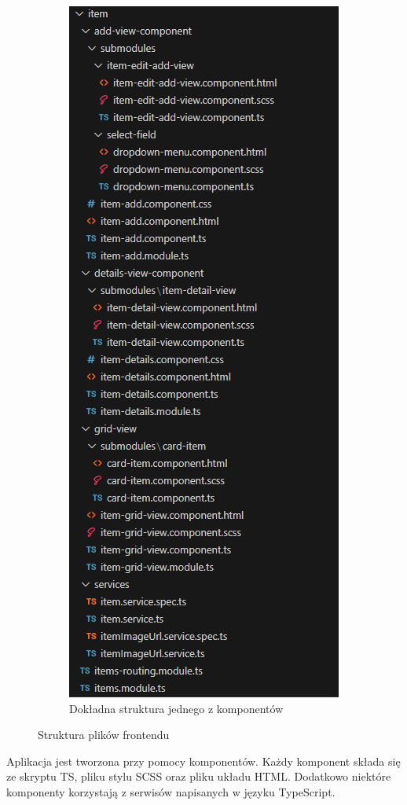 \documentclass[../../main.tex]{subfiles}
\begin{document}
\begin{figure}[ht!]
\begin{subfigure}{.5\textwidth}
            \includegraphics[height=0.4\pdfpageheight]{images/frontend-repo-structure-feature.png}
            \caption{Dokładna struktura jednego z komponentów}
            \label{fig:front-repo-structure-feature}
        \end{subfigure}
        \caption{Struktura plików frontendu}
        \label{fig:frontend-repo-structure}
    \end{figure}

    Aplikacja jest tworzona przy pomocy komponentów. Każdy komponent składa się ze skryptu TS, pliku stylu SCSS oraz pliku układu HTML. Dodatkowo niektóre komponenty korzystają z serwisów napisanych w języku TypeScript. 
\end{document}
